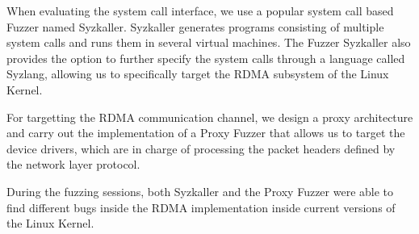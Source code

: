 When evaluating the system call interface, we use a popular system call based Fuzzer named Syzkaller.
Syzkaller generates programs consisting of multiple system calls and runs them in several virtual machines. The
Fuzzer Syzkaller also provides the option to further specify the system calls through a language called Syzlang,
allowing us to specifically target the RDMA subsystem of the Linux Kernel.

For targetting the RDMA communication channel, we design a proxy architecture and carry out the implementation
of a Proxy Fuzzer that allows us to target the device drivers, which are in charge of processing the packet headers
defined by the network layer protocol.


During the fuzzing sessions, both Syzkaller and the Proxy Fuzzer were able to find
different bugs inside the RDMA implementation inside current versions of the Linux Kernel.














